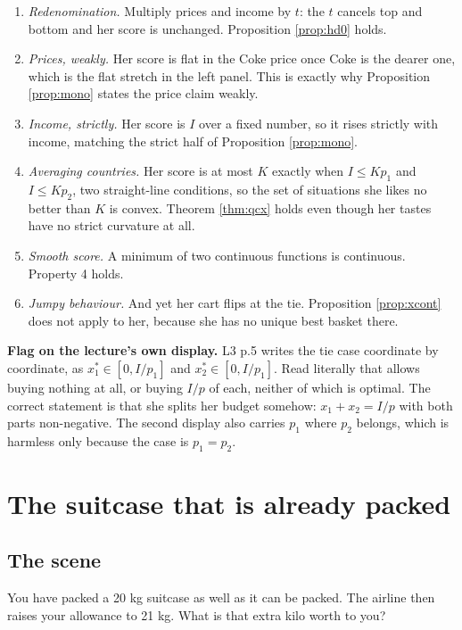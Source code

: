 \documentclass[11pt,letterpaper]{article}
\theoremstyle{definition}
\theoremstyle{plain}
\begin{document}
\begin{enumerate}[leftmargin=*,itemsep=2pt]
\item \emph{Redenomination.} Multiply prices and income by $t$: the $t$ cancels top and bottom and
her score is unchanged. Proposition \ref{prop:hd0} holds.
\item \emph{Prices, weakly.} Her score is flat in the Coke price once Coke is the dearer one, which
is the flat stretch in the left panel. This is exactly why Proposition \ref{prop:mono} states the
price claim weakly.
\item \emph{Income, strictly.} Her score is $I$ over a fixed number, so it rises strictly with
income, matching the strict half of Proposition \ref{prop:mono}.
\item \emph{Averaging countries.} Her score is at most $K$ exactly when
$I \le K p_1$ and $I \le K p_2$, two straight-line conditions, so the set of situations she likes no
better than $K$ is convex. Theorem \ref{thm:qcx} holds even though her tastes have no strict
curvature at all.
\item \emph{Smooth score.} A minimum of two continuous functions is continuous. Property 4 holds.
\item \emph{Jumpy behaviour.} And yet her cart flips at the tie. Proposition \ref{prop:xcont} does
not apply to her, because she has no unique best basket there.
\end{enumerate}

\begin{snugshade}
\noindent\textbf{Flag on the lecture's own display.} L3 p.5 writes the tie case coordinate by
coordinate, as $x_1^* \in [0, I/p_1]$ and $x_2^* \in [0, I/p_1]$. Read literally that allows buying
nothing at all, or buying $I/p$ of each, neither of which is optimal. The correct statement is that
she splits her budget somehow: $x_1 + x_2 = I/p$ with both parts non-negative. The second display
also carries $p_1$ where $p_2$ belongs, which is harmless only because the case is $p_1 = p_2$.
\end{snugshade}
\section{The suitcase that is already packed}
\label{sec:q5}

\subsection{The scene}

You have packed a 20 kg suitcase as well as it can be packed. The airline then raises your allowance
to 21 kg. What is that extra kilo worth to you?
\end{document}
